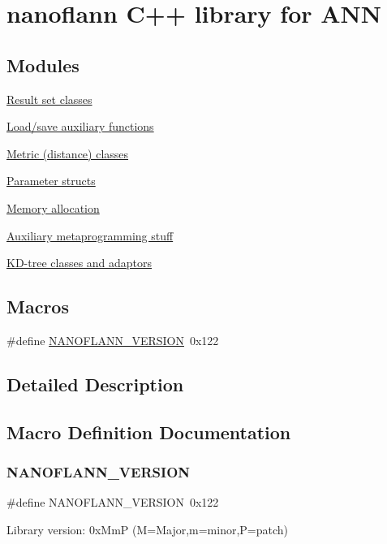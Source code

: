 \hypertarget{group__nanoflann__grp}{}\section{nanoflann C++ library for A\+NN}
\label{group__nanoflann__grp}
\subsection*{Modules}
\begin{DoxyCompactItemize}
\item 
\hyperlink{group__result__sets__grp}{Result set classes}
\item 
\hyperlink{group__loadsave__grp}{Load/save auxiliary functions}
\item 
\hyperlink{group__metric__grp}{Metric (distance) classes}
\item 
\hyperlink{group__param__grp}{Parameter structs}
\item 
\hyperlink{group__memalloc__grp}{Memory allocation}
\item 
\hyperlink{group__nanoflann__metaprog__grp}{Auxiliary metaprogramming stuff}
\item 
\hyperlink{group__kdtrees__grp}{K\+D-\/tree classes and adaptors}
\end{DoxyCompactItemize}
\subsection*{Macros}
\begin{DoxyCompactItemize}
\item 
\#define \hyperlink{group__nanoflann__grp_ga7b8efca796d8e1861a432a5f6b8404a1}{N\+A\+N\+O\+F\+L\+A\+N\+N\+\_\+\+V\+E\+R\+S\+I\+ON}~0x122
\end{DoxyCompactItemize}


\subsection{Detailed Description}


\subsection{Macro Definition Documentation}
\hypertarget{group__nanoflann__grp_ga7b8efca796d8e1861a432a5f6b8404a1}{}\label{group__nanoflann__grp_ga7b8efca796d8e1861a432a5f6b8404a1} 
\subsubsection{\texorpdfstring{N\+A\+N\+O\+F\+L\+A\+N\+N\+\_\+\+V\+E\+R\+S\+I\+ON}{NANOFLANN\_VERSION}}
{\footnotesize\ttfamily \#define N\+A\+N\+O\+F\+L\+A\+N\+N\+\_\+\+V\+E\+R\+S\+I\+ON~0x122}

Library version\+: 0x\+MmP (M=Major,m=minor,P=patch) 